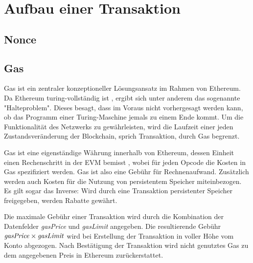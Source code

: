 \documentclass[runningheads]{llncs}
\begin{document}
\section{Aufbau einer Transaktion}

\subsection{Nonce}
\label{nonce}
\subsection{Gas}
\label{gas}
Gas ist ein zentraler konzeptioneller Lösungsansatz im Rahmen von Ethereum. Da Ethereum turing-vollständig ist \cite[S. 1]{wood_ethereum/yellowpaper_2019}, ergibt sich unter anderem das sogenannte "Halteproblem". Dieses besagt, dass im Voraus nicht vorhergesagt werden kann, ob das Programm einer Turing-Maschine jemals zu einem Ende kommt. \cite[S.70]{davis_computability_2013} Um die Funktionalität des Netzwerks zu gewährleisten, wird die Laufzeit einer jeden Zustandsveränderung der Blockchain, sprich Transaktion, durch Gas begrenzt.

Gas ist eine eigenständige Währung innerhalb von Ethereum, dessen Einheit einen Rechenschritt in der EVM bemisst \cite[S. 9:3]{m.spain_oasics-tokeneconomics_2019}, wobei für jeden Opcode die Kosten in Gas spezifiziert werden. \cite[S. 25 ff.]{wood_ethereum/yellowpaper_2019} Gas ist also eine Gebühr für Rechnenaufwand. Zusätzlich werden auch Kosten für die Nutzung von persistentem Speicher miteinbezogen. Es gilt sogar das Inverse: Wird durch eine Transaktion persistenter Speicher freigegeben, werden Rabatte gewährt.

Die maximale Gebühr einer Transaktion wird durch die Kombination der Datenfelder \textit{gasPrice} und \textit{gasLimit} angegeben. Die resultierende Gebühr $ \text{\textit{gasPrice}} \times \text{\textit{gasLimit}} $ wird bei Erstellung der Transaktion in voller Höhe vom Konto abgezogen. Nach Bestätigung der Transaktion wird nicht genutztes Gas zu dem angegebenen Preis in Ethereum zurückerstattet.
\end{document}
